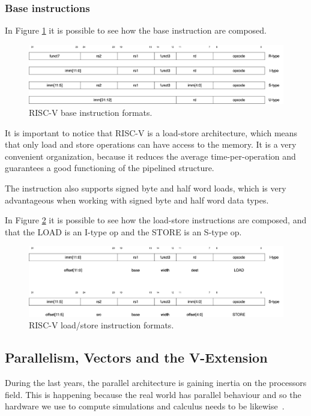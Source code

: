 \subsubsection{Base instructions}
In Figure \ref{riscv-base-instruction-formats} it is possible to see how the base instruction are composed.

\begin{figure}[H]
    \centering
    \includegraphics[scale = 0.27]{Chapter_1/img/riscv-base-instruction-formats.png}
    \caption{RISC-V base instruction formats. \cite{RISC-V-Instruction-Set-Manual}}
    \label{riscv-base-instruction-formats}
\end{figure}

It is important to notice that RISC-V is a load-store architecture, which means that only load and store operations can have access to the memory.
It is a very convenient organization, because it reduces the average time-per-operation and guarantees a good functioning of the pipelined structure.

The instruction also supports signed byte and half word loads, which is very advantageous when working with signed byte and half word data types.

In Figure \ref{riscv-load-store} it is possible to see how the load-store instructions are composed, and that the LOAD is an I-type op and the STORE is an S-type op.

\begin{figure}[H]
    \centering
    \includegraphics[scale = 0.27]{Chapter_1/img/riscv-load-store.png}
    \caption{RISC-V load/store instruction formats. \cite{RISC-V-Instruction-Set-Manual}}
    \label{riscv-load-store}
\end{figure}


\subsection{Parallelism, Vectors and the V-Extension}
During the last years, the parallel architecture is gaining inertia on the processors field. This is happening because the real world has parallel behaviour and so the hardware we use to compute simulations and calculus needs to be likewise~\cite{Parallel-Computing}.

